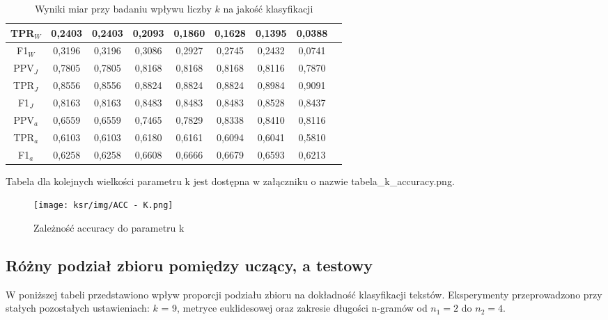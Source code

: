 \documentclass{article}
\begin{document}
\begin{table}[h!]
\begin{tabular}{|c|c|c|c|c|c|c|c|c|}
    TPR\(_W\) & 0,2403 & 0,2403 & 0,2093 & 0,1860& 0,1628& 0,1395& 0,0388\\ \hline
    F1\(_W\) & 0,3196 & 0,3196 & 0,3086 & 0,2927& 0,2745& 0,2432& 0,0741\\ \hline
    PPV\(_J\) & 0,7805 & 0,7805 & 0,8168 & 0,8168& 0,8168& 0,8116& 0,7870\\ \hline
    TPR\(_J\) & 0,8556 & 0,8556 & 0,8824 &  0,8824& 0,8824& 0,8984& 0,9091\\ \hline
    F1\(_J\) & 0,8163 & 0,8163 & 0,8483 &  0,8483& 0,8483& 0,8528& 0,8437\\ \hline
    PPV\(_a\) & 0,6559 & 0,6559 & 0,7465 & 0,7829 & 0,8338 & 0,8410 & 0,8116\\ \hline
    TPR\(_a\) & 0,6103 & 0,6103 & 0,6180 & 0,6161 & 0,6094 & 0,6041 & 0,5810\\ \hline
    F1\(_a\) & 0,6258 & 0,6258 & 0,6608 & 0,6666 & 0,6679 & 0,6593 & 0,6213\\ \hline
    \end{tabular}
    \caption{Wyniki miar przy badaniu wpływu liczby \(k\) na jakość klasyfikacji}
\end{table}

Tabela dla kolejnych wielkości parametru k jest dostępna w załączniku o nazwie tabela\_k\_accuracy.png.

\begin{figure}[H]
    \centering
    \texttt{[image: ksr/img/ACC - K.png]}
    \caption{Zależność accuracy do parametru k}
    \label{fig:moj-obraz}
\end{figure}

\subsection{Różny podział zbioru pomiędzy uczący, a testowy}
W poniższej tabeli przedstawiono wpływ proporcji podziału zbioru na dokładność klasyfikacji tekstów. Eksperymenty przeprowadzono przy stałych pozostałych ustawieniach: \(k\) = 9, metryce euklidesowej oraz zakresie długości n-gramów od \(n_1 = 2\) do \(n_2 = 4\).
\end{document}
